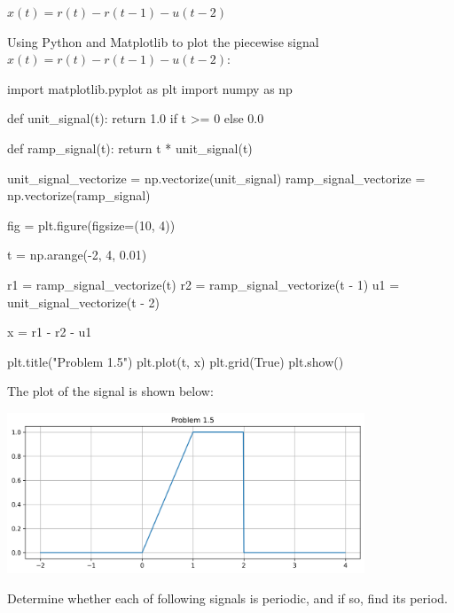 \documentclass[a4paper, 10pt]{article}
\begin{document}
\begin{tosubmit}
\begin{subproblems}[start=5]
    \item \( x(t) = r(t) - r(t - 1) - u(t - 2) \)
\end{subproblems}

\begin{solution}
Using Python and Matplotlib to plot the piecewise signal \( x(t) = r(t) - r(t - 1) - u(t - 2) \):
\begin{codingbox}
import matplotlib.pyplot as plt
import numpy as np

def unit_signal(t):
    return 1.0 if t >= 0 else 0.0

def ramp_signal(t):
    return t * unit_signal(t)

unit_signal_vectorize = np.vectorize(unit_signal)
ramp_signal_vectorize = np.vectorize(ramp_signal)

fig = plt.figure(figsize=(10, 4))

t = np.arange(-2, 4, 0.01)

r1 = ramp_signal_vectorize(t)
r2 = ramp_signal_vectorize(t - 1)
u1 = unit_signal_vectorize(t - 2)

x = r1 - r2 - u1

plt.title("Problem 1.5")
plt.plot(t, x)
plt.grid(True)
plt.show()
\end{codingbox}

The plot of the signal is shown below:
\begin{center}
    \includegraphics[width=0.8\textwidth]{images/problem_1_5.png}
\end{center}
\end{solution}
\end{tosubmit}


\newpage

\begin{problem}
Determine whether each of following signals is periodic, and if so, find its period.
\end{problem}
\end{document}
